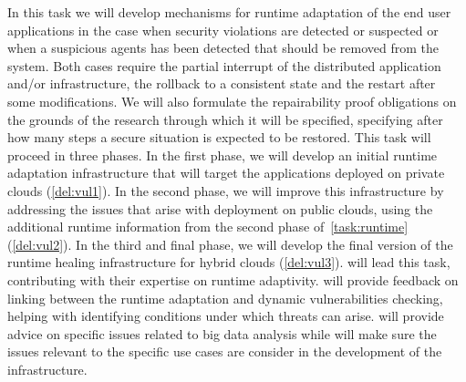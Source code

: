 \begin{Workpackage}{\thewpno}
\begin{Task}
\TaskResults{%
\ref{del:vul1},
\ref{del:vul2},
\ref{del:vul3}
}
\TaskHeader{}
In this task we will develop mechanisms for runtime adaptation of the end user applications in the case when security violations are detected or suspected or when a suspicious agents has been detected that should be removed from the system. Both cases require the partial interrupt of the distributed application and/or infrastructure, the rollback to a consistent state and the restart after some modifications. We will also formulate the repairability proof obligations on the grounds of the research through which it will be specified, specifying after how many steps a secure situation is expected to be restored. 
This task will proceed in three phases. In the first phase, we will develop an initial runtime adaptation infrastructure that will target the applications deployed on private clouds (\ref{del:vul1}). In the second phase, we will improve this infrastructure by addressing the issues that arise with deployment on public clouds, using the additional runtime information from the second phase of~\ref{task:runtime} (\ref{del:vul2}). In the third and final phase, we will develop the final version of the runtime healing infrastructure for hybrid clouds (\ref{del:vul3}). \SCCHshort{} will lead this task, contributing with their expertise on runtime adaptivity. \IBMshort{} will provide feedback on linking between the runtime adaptation and dynamic vulnerabilities checking, helping with identifying conditions under which threats can arise. \UODshort{} will provide advice on specific issues related to big data analysis while \SOPRAshort{} will make sure the issues relevant to the specific use cases are consider in the development of the infrastructure.
\end{Task}



\end{Workpackage}
